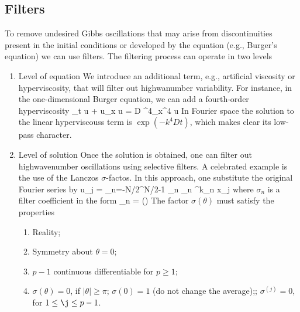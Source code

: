 \documentclass[11pt]{article}
\begin{document}
\subsection*{Filters}
To remove undesired Gibbs oscillations that may arise from discontinuities present in the initial conditions or developed by the equation (e.g., Burger's equation) we can use filters. The filtering process can operate in two levels
\begin{enumerate}
    \item Level of equation
        \subitem We introduce an additional term, e.g., artificial viscosity or hyperviscosity, that will filter out highwanumber variability. For instance, in the one-dimensional Burger equation, we can add a fourth-order hyperviscosity
        \beq
            \label{eq:burgers_1d_hv}
            \p_t u + u\p_x u = D \p^4_{x^4} u\per
        \eeq
        In Fourier space the solution to the linear hyperviscouss term is $\exp(-k^4 D t)$, which makes clear its low-pass character.

    \item Level of solution
        \subitem Once the solution is obtained, one can filter out highwavenumber oscillations using selective filters. A celebrated example is the use of the Lanczos $\sigma$-factos. In this approach, one substitute the original Fourier series by
        \beq
            \label{eq:lanczos_fact}
            u_j = \sum_{n=-N/2}^{N/2-1} \sigma_n _n \ee^{\ii k_n x_j}\com
        \eeq    
        where $\sigma_n$ is a filter coefficient in the form
        \beq
            \label{eq_sigma}
            \sigma_n = \sigma(\theta)\com\qquad \theta{} {}\per
        \eeq
        The factor $\sigma(\theta)$ must satisfy the properties
        \begin{enumerate}
            \item Reality;
            \item Symmetry about $\theta = 0$; 
            \item $p-1$ continuous differentiable  for $p\ge 1$;
            \item 
                \subitem $\sigma(\theta) = 0$, if $|\theta|\ge \pi$;
                \subitem $\sigma(0) = 1$  (do not change the average);;
                \subitem $\sigma^{(j)} = 0$, for $1\le\j\le p-1$.
        \end{enumerate}


\end{enumerate}
\end{document}
